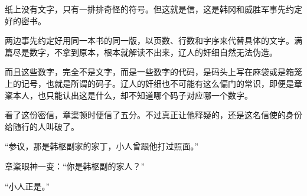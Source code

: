 纸上没有文字，只有一排排奇怪的符号。但这就是信，这是韩冈和威胜军事先约定好的密书。

两边事先约定好用同一本书的同一版，以页数、行数和字序来代替具体的文字。满篇尽是数字，不拿到原本，根本就解读不出来，辽人的奸细自然无法伪造。

而且这些数字，完全不是文字，而是一些数字的代码，是码头上写在麻袋或是箱笼上的记号，也就是所谓的码子。辽人的奸细也不可能有这么偏门的常识，即便是章楶本人，也只能认出这是什么，却不知道哪个码子对应哪一个数字。

看了这份密信，章楶顿时便信了五分。不过真正让他释疑的，还是这名信使的身份给随行的人叫破了。

“参议，那是韩枢副家的家丁，小人曾跟他打过照面。”

章楶眼神一变：“你是韩枢副的家人？”

“小人正是。”

